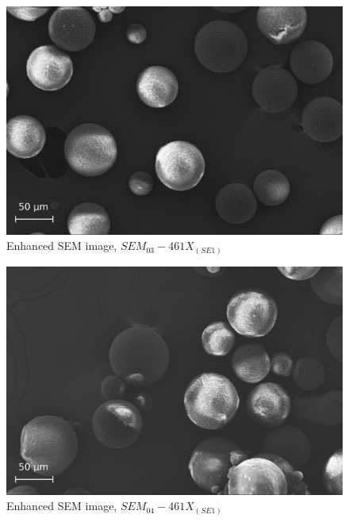 \documentclass{article}
\begin{document}
          \begin{figure}[h!]
              \centering 
              \includegraphics[width=\textwidth]{Pictures/SEM/Edited/04_03.eps}
              \caption{Enhanced SEM image, $SEM_{03}-461X_{(SE1)}$ \autocites{Pixelmator_Pro}{GIMP}}
              \label{fig:SEM_03}
          \end{figure}

          \begin{figure}[h!]
              \centering 
              \includegraphics[width=\textwidth]{Pictures/SEM/Edited/05_03.eps}
              \caption{Enhanced SEM image, $SEM_{04}-461X_{(SE1)}$ \autocites{Pixelmator_Pro}{GIMP}}
              \label{fig:SEM_04}
          \end{figure}
      
\end{document}
